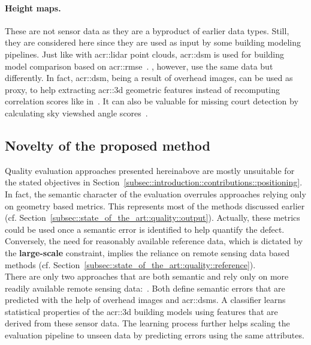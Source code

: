             \paragraph{Height maps.}
                These are not sensor data as they are a byproduct of earlier data types.
                Still, they are considered here since they are used as input by some building modeling pipelines.
                Just like with \gls{acr::lidar} point clouds, \gls{acr::dsm} is used for building model comparison based on \gls{acr::rmse}~\parencite{zeng2018neural}.
                \textcite{michelin2013quality}, however, use the same data but differently.
                In fact, \gls{acr::dsm}, being a result of overhead images, can be used as proxy, to help extracting \gls{acr::3d} geometric features instead of recomputing correlation scores like in~\parencite{boudet2006supervised}.
                It can also be valuable for missing court detection by calculating sky viewshed angle scores~\parencite{michelin2013quality}.

    \subsection{Novelty of the proposed method}
        \label{subsec::state_of_the_art::quality::novelty}
        Quality evaluation approaches presented hereinabove are mostly unsuitable for the stated objectives in Section~\ref{subsec::introduction::contributions::positioning}.\\

        In fact, the semantic character of the evaluation overrules approaches relying only on geometry based metrics.
        This represents most of the methods discussed earlier (cf. Section~\ref{subsec::state_of_the_art::quality::output}).
        Actually, these metrics could be used once a semantic error is identified to help quantify the defect.
        Conversely, the need for reasonably available reference data, which is dictated by the \textbf{large-scale} constraint, implies the reliance on remote sensing data based methods (cf. Section~\ref{subsec::state_of_the_art::quality::reference}).\\

        There are only two approaches that are both semantic and rely only on more readily available remote sensing data:~\parencite{boudet2006supervised,michelin2013quality}.
        Both define semantic errors that are predicted with the help of overhead images and \glspl{acr::dsm}.
        A classifier learns statistical properties of the \gls{acr::3d} building models using features that are derived from these sensor data.
        The learning process further helps scaling the evaluation pipeline to unseen data by predicting errors using the same attributes.\\

